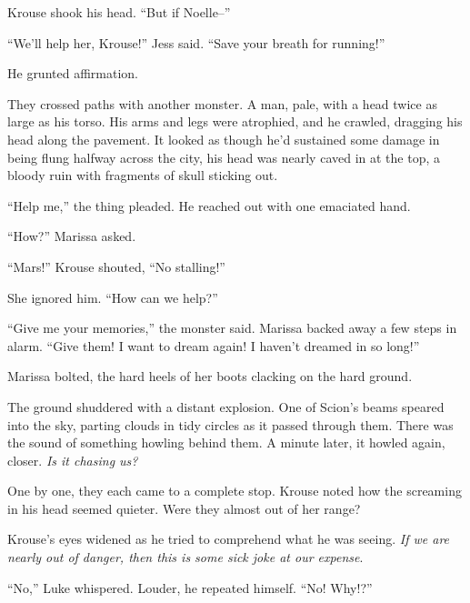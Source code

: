 Krouse shook his head.  ``But if Noelle--''



``We'll help her, Krouse!''  Jess said.  ``Save your breath for running!''



He grunted affirmation.



They crossed paths with another monster.  A man, pale, with a head twice as large as his torso.  His arms and legs were atrophied, and he crawled, dragging his head along the pavement.  It looked as though he'd sustained some damage in being flung halfway across the city, his head was nearly caved in at the top, a bloody ruin with fragments of skull sticking out.



``Help me,'' the thing pleaded.  He reached out with one emaciated hand.



``How?'' Marissa asked.



``Mars!''  Krouse shouted, ``No stalling!''



She ignored him.  ``How can we help?''



``Give me your memories,'' the monster said.  Marissa backed away a few steps in alarm.  ``Give them!  I want to dream again!  I haven't dreamed in so long!''



Marissa bolted, the hard heels of her boots clacking on the hard ground.



The ground shuddered with a distant explosion.  One of Scion's beams speared into the sky, parting clouds in tidy circles as it passed through them.  There was the sound of something howling behind them.  A minute later, it howled again, closer.  \emph{Is it chasing us?  }



One by one, they each came to a complete stop.  Krouse noted how the screaming in his head seemed quieter.  Were they almost out of her range?



Krouse's eyes widened as he tried to comprehend what he was seeing. \emph{If we are nearly out of danger, then this is some sick joke at our expense}.



``No,'' Luke whispered.  Louder, he repeated himself.  ``No!  Why!?''



